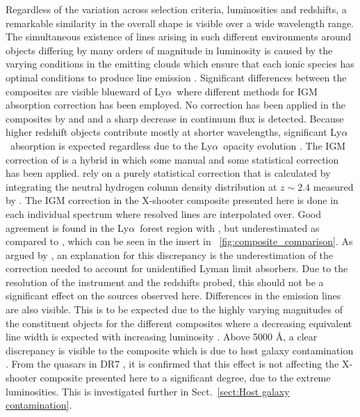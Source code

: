 \documentclass{aa}    %
\newcommand{\figref}[1]{\ref{fig:#1}}
\newcommand{\Fig}[1]{\figurename~\figref{#1}}
\newcommand{\fig}[1]{\Fig{#1}}
\newcommand{\sectionname}{Sect.}
\newcommand{\Sect}[1]{\sectionname~\ref{sect:#1}}
\newcommand{\sect}[1]{\Sect{#1}}
\newcommand{\lya}{Ly$\alpha$}
\begin{document}
Regardless of the variation across selection criteria, luminosities and
redshifts, a remarkable similarity in the overall shape is visible
over a wide wavelength range. The simultaneous existence of lines
arising in such different environments around objects differing by
many orders of magnitude in luminosity is caused by the varying
conditions in the emitting clouds which ensure that each ionic species has optimal conditions to produce line emission \citep{Baldwin1995}.
Significant differences between the composites are visible blueward of
\lya~where different methods for IGM absorption correction has been
employed. No correction has been applied in the composites by
\citet{Francis1991} and \citet{VandenBerk2001} and a sharp decrease in
continuum flux is detected. Because higher redshift objects contribute
mostly at shorter wavelengths, significant \lya~absorption is
expected regardless due to the \lya~opacity evolution
\citep{Moller1990, Madau1995, DallAglio2008}. The IGM correction of
\citet{Telfer2002} is a hybrid in which some manual and some
statistical correction has been applied. \citet{Lusso2015} rely on a purely statistical correction that is calculated
by integrating the neutral hydrogen column density distribution at $z
\sim 2.4$ measured by \cite{Prochaska2014b}. The IGM correction in the
X-shooter composite presented here is done in each individual spectrum
where resolved lines are interpolated over. Good agreement is found in
the \lya~forest region with \cite{Telfer2002}, but underestimated as
compared to \cite{Lusso2015}, which can be seen in the insert in
\fig{composite_comparison}. As argued by \cite{Lusso2015}, an
explanation for this discrepancy is the underestimation of the
correction needed to account for unidentified Lyman limit
absorbers. Due to the resolution of the instrument and the redshifts
probed, this should not be a significant effect on the sources
observed here.  Differences in the emission lines are also
visible. This is to be expected due to the highly varying magnitudes
of the constituent objects for the different composites where a
decreasing equivalent line width is expected with increasing
luminosity \citep{Baldwin1977}.  Above 5000 \AA, a clear discrepancy
is visible to the \citet{VandenBerk2001} composite which is due to
host galaxy contamination \citep{Glikman2006}. From the quasars in
DR7 \citep{Shen2011}, it is confirmed that this effect is not
affecting the X-shooter composite presented here to a significant
degree, due to the extreme luminosities. This is investigated further
in \sect{Host galaxy
contamination}.
\end{document}
